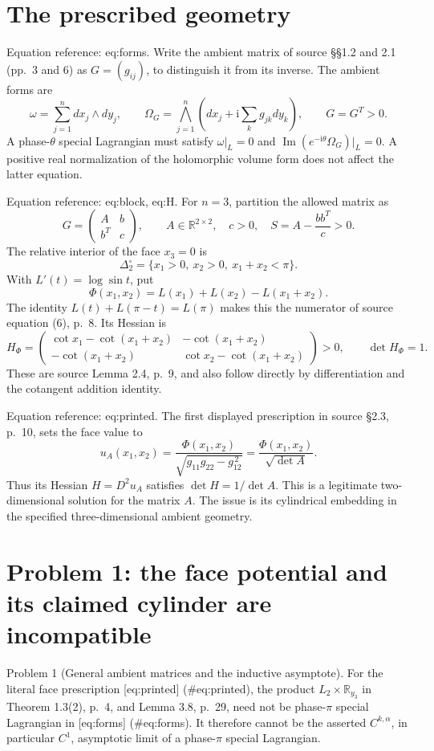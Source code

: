 \documentclass[10pt]{article}
\begin{document}
\section*{The prescribed geometry}
Equation reference: eq:forms. Write the ambient matrix of source §§1.2 and 2.1 (pp. 3 and 6) as \(G=(g_{ij})\), to distinguish it from its inverse. The ambient forms are \[
 \omega=\sum_{j=1}^n dx_j\wedge dy_j,\qquad
 \Omega_G=\bigwedge_{j=1}^n\left(dx_j+\mathrm i\sum_k g_{jk}dy_k\right),
 \qquad G=G^{T}>0.\] A phase-\(\theta\) special Lagrangian must satisfy \(\omega|_L=0\) and \(\operatorname{Im}(e^{-\mathrm i\theta}\Omega_G)|_L=0\). A positive real normalization of the holomorphic volume form does not affect the latter equation.\par
Equation reference: eq:block, eq:H. For \(n=3\), partition the allowed matrix as \[
 G=\begin{pmatrix}A&b\\ b^{T}&c\end{pmatrix},\qquad
 A\in\mathbb R^{2\times2},\quad c>0,\quad
 S=A-\frac{bb^{T}}c>0.\] The relative interior of the face \(x_3=0\) is \[\Delta_2^\circ=\{x_1>0,\ x_2>0,\ x_1+x_2<\pi\}.\] With \(L'(t)=\log\sin t\), put \[\Phi(x_1,x_2)=L(x_1)+L(x_2)-L(x_1+x_2).\] The identity \(L(t)+L(\pi-t)=L(\pi)\) makes this the numerator of source equation (6), p. 8. Its Hessian is \[
 H_\Phi=
 \begin{pmatrix}
 \cot x_1-\cot(x_1+x_2)&-\cot(x_1+x_2)\\
 -\cot(x_1+x_2)&\cot x_2-\cot(x_1+x_2)
 \end{pmatrix}>0,\qquad \det H_\Phi=1.\] These are source Lemma 2.4, p. 9, and also follow directly by differentiation and the cotangent addition identity.\par
Equation reference: eq:printed. The first displayed prescription in source §2.3, p. 10, sets the face value to \[
 u_A(x_1,x_2)=\frac{\Phi(x_1,x_2)}{\sqrt{g_{11}g_{22}-g_{12}^{\,2}}}
            =\frac{\Phi(x_1,x_2)}{\sqrt{\det A}}.\] Thus its Hessian \(H=D^2u_A\) satisfies \(\det H=1/\det A\). This is a legitimate two-dimensional solution for the matrix \(A\). The issue is its cylindrical embedding in the specified three-dimensional ambient geometry.\par
\section*{Problem 1: the face potential and its claimed cylinder are incompatible}
Problem 1 (General ambient matrices and the inductive asymptote).  For the literal face prescription [eq:printed] (\#eq:printed), the product \(L_2\times\mathbb R_{y_3}\) in Theorem 1.3(2), p. 4, and Lemma 3.8, p. 29, need not be phase-\(\pi\) special Lagrangian in [eq:forms] (\#eq:forms). It therefore cannot be the asserted \(C^{k,\alpha}\), in particular \(C^1\), asymptotic limit of a phase-\(\pi\) special Lagrangian.\par
\end{document}
